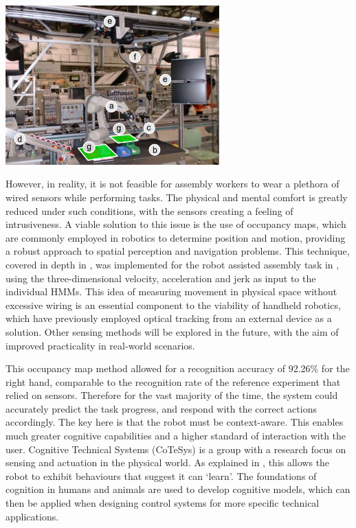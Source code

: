 \documentclass[11pt]{article}
\begin{document}
\begin{center}
\includegraphics[width = 0.62\textwidth]{jahir.png}
\label{figure:jahir}
\end{center}

However, in reality, it is not feasible for assembly workers to wear a plethora of wired sensors while performing tasks. The physical and mental comfort is greatly reduced under such conditions, with the sensors creating a feeling of intrusiveness. A viable solution to this issue is the use of occupancy maps, which are commonly employed in robotics to determine position and motion, providing a robust approach to spatial perception and navigation problems. This technique, covered in depth in \cite{elfes1989}, was implemented for the robot assisted assembly task in \cite{lenz2011}, using the three-dimensional velocity, acceleration and jerk as input to the individual HMMs. This idea of measuring movement in physical space without excessive wiring is an essential component to the viability of handheld robotics, which have previously employed optical tracking from an external device as a solution. Other sensing methods will be explored in the future, with the aim of improved practicality in real-world scenarios.

This occupancy map method allowed for a recognition accuracy of 92.26\% for the right hand, comparable to the recognition rate of the reference experiment that relied on sensors. Therefore for the vast majority of the time, the system could accurately predict the task progress, and respond with the correct actions accordingly. The key here is that the robot must be context-aware. This enables much greater cognitive capabilities and a higher standard of interaction with the user. Cognitive Technical Systems (CoTeSys) is a group with a research focus on sensing and actuation in the physical world. As explained in \cite{buss2010}, this allows the robot to exhibit behaviours that suggest it can `learn'. The foundations of cognition in humans and animals are used to develop cognitive models, which can then be applied when designing control systems for more specific technical applications. 
\end{document}
